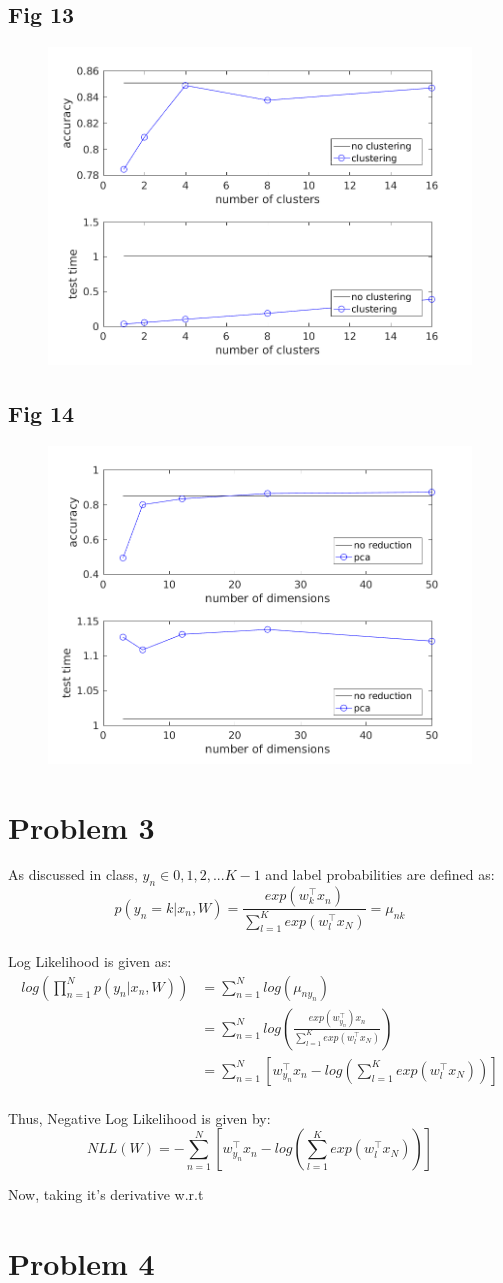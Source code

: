 \documentclass{article}
\begin{document}
\subsection{Fig 13}
\begin{figure}[h!]
\begin{center}
\includegraphics[width=0.5\columnwidth]{RunResults2/13.png}
\label{13}
\end{center}
\end{figure}

\subsection{Fig 14}
\begin{figure}[h!]
\begin{center}
\includegraphics[width=0.5\columnwidth]{RunResults2/14.png}
\label{14}
\end{center}
\end{figure}

\section{Problem 3}
As discussed in class, $y_n \in {0,1,2, ... K-1}$ and label probabilities are defined as:
$$p(y_n=k|x_n,W) = \frac{exp(w_k^\top x_n)}{\sum_{l=1}^{K}exp(w_l^\top x_N)} = \mu_{nk}$$
\\
Log Likelihood is given as:
\begin{equation*}
\begin{aligned}
log(\prod_{n=1}^N p(y_n|x_n,W)) &=  \sum_{n=1}^N log(\mu_{ny_n}) \\
&=  \sum_{n=1}^N log(\frac{exp(w_{y_n}^\top)x_n}{\sum_{l=1}^K exp(w_l^\top x_N)}) \\ 
&= \sum_{n=1}^N [w_{y_n}^\top x_n - log(\sum_{l=1}^K exp(w_l^\top x_N))] \\ 
\end{aligned}
\end{equation*}
\newpage

Thus, Negative Log Likelihood is given by:
$$NLL(W) =  -\sum_{n=1}^N [w_{y_n}^\top x_n - log(\sum_{l=1}^K exp(w_l^\top x_N))]  $$

Now, taking it's derivative w.r.t 


\section{Problem 4}
\end{document}
